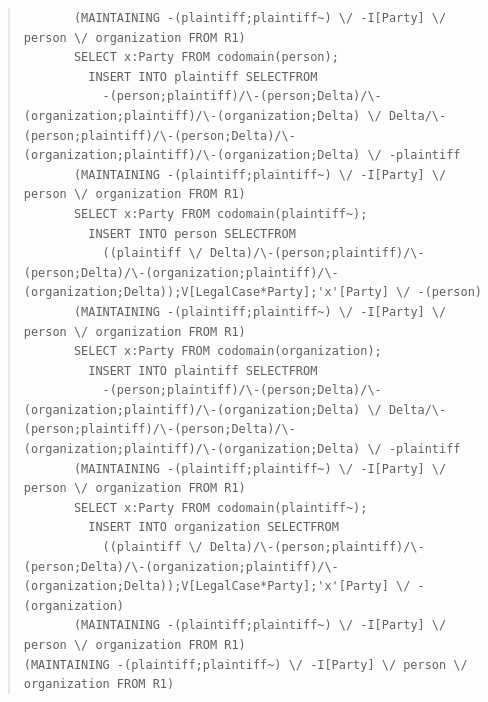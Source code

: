 \documentclass[10pt,a4paper]{report}              %
\theoremstyle{plain}\theorembodyfont{\rmfamily}\newtheorem{definition}{Definition}[section]
\theoremstyle{plain}\theorembodyfont{\rmfamily}\newtheorem{designrule}[definition]{Requirement}
\begin{document}
\begin{quote}
\begin{verbatim}
       (MAINTAINING -(plaintiff;plaintiff~) \/ -I[Party] \/ person \/ organization FROM R1)
       SELECT x:Party FROM codomain(person);
         INSERT INTO plaintiff SELECTFROM
           -(person;plaintiff)/\-(person;Delta)/\-(organization;plaintiff)/\-(organization;Delta) \/ Delta/\-(person;plaintiff)/\-(person;Delta)/\-(organization;plaintiff)/\-(organization;Delta) \/ -plaintiff
       (MAINTAINING -(plaintiff;plaintiff~) \/ -I[Party] \/ person \/ organization FROM R1)
       SELECT x:Party FROM codomain(plaintiff~);
         INSERT INTO person SELECTFROM
           ((plaintiff \/ Delta)/\-(person;plaintiff)/\-(person;Delta)/\-(organization;plaintiff)/\-(organization;Delta));V[LegalCase*Party];'x'[Party] \/ -(person)
       (MAINTAINING -(plaintiff;plaintiff~) \/ -I[Party] \/ person \/ organization FROM R1)
       SELECT x:Party FROM codomain(organization);
         INSERT INTO plaintiff SELECTFROM
           -(person;plaintiff)/\-(person;Delta)/\-(organization;plaintiff)/\-(organization;Delta) \/ Delta/\-(person;plaintiff)/\-(person;Delta)/\-(organization;plaintiff)/\-(organization;Delta) \/ -plaintiff
       (MAINTAINING -(plaintiff;plaintiff~) \/ -I[Party] \/ person \/ organization FROM R1)
       SELECT x:Party FROM codomain(plaintiff~);
         INSERT INTO organization SELECTFROM
           ((plaintiff \/ Delta)/\-(person;plaintiff)/\-(person;Delta)/\-(organization;plaintiff)/\-(organization;Delta));V[LegalCase*Party];'x'[Party] \/ -(organization)
       (MAINTAINING -(plaintiff;plaintiff~) \/ -I[Party] \/ person \/ organization FROM R1)
(MAINTAINING -(plaintiff;plaintiff~) \/ -I[Party] \/ person \/ organization FROM R1)
\end{verbatim}
\end{quote}
\end{document}
